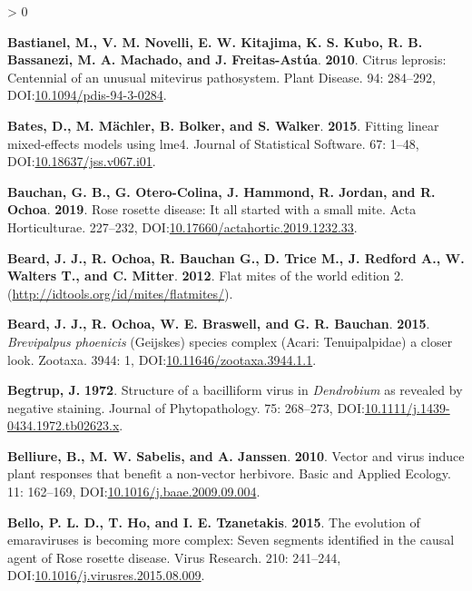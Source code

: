 \documentclass{ufdissertation}[overrideChapters] %
\newlength{\cslhangindent}
\newenvironment{CSLReferences}[2] %
 {%
  \setlength{\parindent}{0pt}
  \ifodd #1 \everypar{\setlength{\hangindent}{\cslhangindent}}\ignorespaces\fi
  \ifnum #2 > 0
  \setlength{\parskip}{#2\baselineskip}
  \fi
 }%
 {}
\begin{document}
{\begin{CSLReferences}{1}{1}
\leavevmode{}%
\textbf{Bastianel, M., V. M. Novelli, E. W. Kitajima, K. S. Kubo, R. B. Bassanezi, M. A. Machado, and J. Freitas-Astúa}. \textbf{2010}. {Citrus leprosis}: Centennial of an unusual mite{\textendash}virus pathosystem. Plant Disease. 94: 284--292, DOI:\href{https://doi.org/10.1094/pdis-94-3-0284}{10.1094/pdis-94-3-0284}.

\leavevmode{}%
\textbf{Bates, D., M. Mächler, B. Bolker, and S. Walker}. \textbf{2015}. Fitting linear mixed-effects models using {lme4}. Journal of Statistical Software. 67: 1--48, DOI:\href{https://doi.org/10.18637/jss.v067.i01}{10.18637/jss.v067.i01}.

\leavevmode{}%
\textbf{Bauchan, G. B., G. Otero-Colina, J. Hammond, R. Jordan, and R. Ochoa}. \textbf{2019}. {Rose rosette disease}: It all started with a small mite. Acta Horticulturae. 227--232, DOI:\href{https://doi.org/10.17660/actahortic.2019.1232.33}{10.17660/actahortic.2019.1232.33}.

\leavevmode{}%
\textbf{Beard, J. J., R. Ochoa, R. Bauchan G., D. Trice M., J. Redford A., W. Walters T., and C. Mitter}. \textbf{2012}. Flat mites of the world edition 2. (\url{http://idtools.org/id/mites/flatmites/}).

\leavevmode{}%
\textbf{Beard, J. J., R. Ochoa, W. E. Braswell, and G. R. Bauchan}. \textbf{2015}. {\emph{Brevipalpus phoenicis}} {(Geijskes)} species complex ({Acari}: {Tenuipalpidae}) \textemdash a closer look. Zootaxa. 3944: 1, DOI:\href{https://doi.org/10.11646/zootaxa.3944.1.1}{10.11646/zootaxa.3944.1.1}.

\leavevmode{}%
\textbf{Begtrup, J.} \textbf{1972}. Structure of a bacilliform virus in {\emph{Dendrobium}} as revealed by negative staining. Journal of Phytopathology. 75: 268--273, DOI:\href{https://doi.org/10.1111/j.1439-0434.1972.tb02623.x}{10.1111/j.1439-0434.1972.tb02623.x}.

\leavevmode{}%
\textbf{Belliure, B., M. W. Sabelis, and A. Janssen}. \textbf{2010}. Vector and virus induce plant responses that benefit a non-vector herbivore. Basic and Applied Ecology. 11: 162--169, DOI:\href{https://doi.org/10.1016/j.baae.2009.09.004}{10.1016/j.baae.2009.09.004}.

\leavevmode{}%
\textbf{Bello, P. L. D., T. Ho, and I. E. Tzanetakis}. \textbf{2015}. The evolution of emaraviruses is becoming more complex: Seven segments identified in the causal agent of {Rose rosette disease}. Virus Research. 210: 241--244, DOI:\href{https://doi.org/10.1016/j.virusres.2015.08.009}{10.1016/j.virusres.2015.08.009}.


\end{CSLReferences}}
\end{document}
